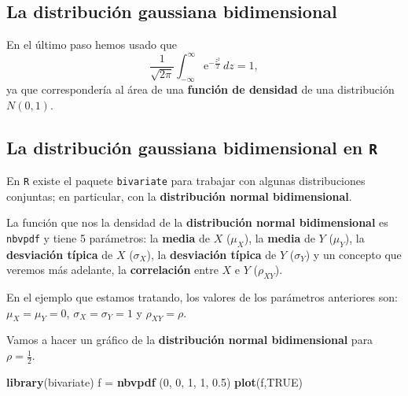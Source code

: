 \documentclass[]{book}
\newenvironment{Shaded}{\begin{snugshade}}{\end{snugshade}}
\newcommand{\DecValTok}[1]{\textcolor[rgb]{0.00,0.00,0.81}{#1}}
\newcommand{\FloatTok}[1]{\textcolor[rgb]{0.00,0.00,0.81}{#1}}
\newcommand{\KeywordTok}[1]{\textcolor[rgb]{0.13,0.29,0.53}{\textbf{#1}}}
\newcommand{\NormalTok}[1]{#1}
\newcommand{\OtherTok}[1]{\textcolor[rgb]{0.56,0.35,0.01}{#1}}
\newcommand{\StringTok}[1]{\textcolor[rgb]{0.31,0.60,0.02}{#1}}
\begin{document}
\hypertarget{la-distribuciuxf3n-gaussiana-bidimensional-3}{%
\subsection{La distribución gaussiana bidimensional}\label{la-distribuciuxf3n-gaussiana-bidimensional-3}}

En el último paso hemos usado que
\[
\frac{1}{\sqrt{2\pi}}\int_{-\infty}^\infty \mathrm{e}^{-\frac{z^2}{2}}\, dz=1,
\]
ya que correspondería al área de una \textbf{función de densidad} de una distribución \(N(0,1)\).

\hypertarget{la-distribuciuxf3n-gaussiana-bidimensional-en-r}{%
\subsection{\texorpdfstring{La distribución gaussiana bidimensional en \texttt{R}}{La distribución gaussiana bidimensional en R}}\label{la-distribuciuxf3n-gaussiana-bidimensional-en-r}}

En \texttt{R} existe el paquete \texttt{bivariate} para trabajar con algunas distribuciones conjuntas; en particular, con la \textbf{distribución normal bidimensional}.

La función que nos la densidad de la \textbf{distribución normal bidimensional} es \texttt{nbvpdf} y tiene 5 parámetros: la \textbf{media} de \(X\) (\(\mu_X\)), la \textbf{media} de \(Y\) (\(\mu_Y\)), la \textbf{desviación típica} de \(X\) (\(\sigma_X\)), la \textbf{desviación típica} de \(Y\) (\(\sigma_Y\)) y un concepto que veremos más adelante, la \textbf{correlación} entre \(X\) e \(Y\) (\(\rho_{XY}\)).

En el ejemplo que estamos tratando, los valores de los parámetros anteriores son: \(\mu_X=\mu_Y=0\), \(\sigma_X=\sigma_Y=1\) y \(\rho_{XY}=\rho.\)

Vamos a hacer un gráfico de la \textbf{distribución normal bidimensional} para \(\rho=\frac{1}{2}.\)

\begin{Shaded}
\begin{Highlighting}[]
\KeywordTok{library}\NormalTok{(bivariate)}
\NormalTok{f =}\StringTok{ }\KeywordTok{nbvpdf}\NormalTok{ (}\DecValTok{0}\NormalTok{, }\DecValTok{0}\NormalTok{, }\DecValTok{1}\NormalTok{, }\DecValTok{1}\NormalTok{, }\FloatTok{0.5}\NormalTok{)}
\KeywordTok{plot}\NormalTok{(f,}\OtherTok{TRUE}\NormalTok{)}
\end{Highlighting}
\end{Shaded}
\end{document}
